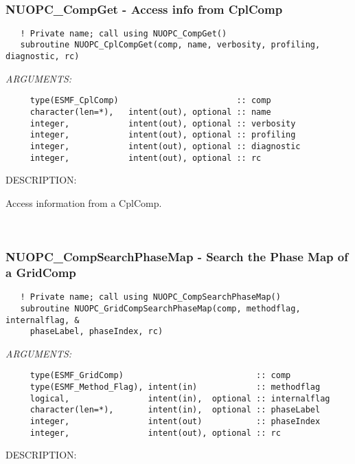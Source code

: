 \mbox{}\hrulefill\ 
 
\subsubsection [NUOPC\_CompGet] {NUOPC\_CompGet - Access info from CplComp}


\begin{verbatim}   ! Private name; call using NUOPC_CompGet()
   subroutine NUOPC_CplCompGet(comp, name, verbosity, profiling, diagnostic, rc)\end{verbatim}{\em ARGUMENTS:}
\begin{verbatim}     type(ESMF_CplComp)                        :: comp
     character(len=*),   intent(out), optional :: name
     integer,            intent(out), optional :: verbosity
     integer,            intent(out), optional :: profiling
     integer,            intent(out), optional :: diagnostic
     integer,            intent(out), optional :: rc \end{verbatim}
{\sf DESCRIPTION:\\ }


   Access information from a CplComp. 
 
\mbox{}\hrulefill\ 
 
\subsubsection [NUOPC\_CompSearchPhaseMap] {NUOPC\_CompSearchPhaseMap - Search the Phase Map of a GridComp}


\begin{verbatim}   ! Private name; call using NUOPC_CompSearchPhaseMap()
   subroutine NUOPC_GridCompSearchPhaseMap(comp, methodflag, internalflag, &
     phaseLabel, phaseIndex, rc)\end{verbatim}{\em ARGUMENTS:}
\begin{verbatim}     type(ESMF_GridComp)                           :: comp
     type(ESMF_Method_Flag), intent(in)            :: methodflag
     logical,                intent(in),  optional :: internalflag
     character(len=*),       intent(in),  optional :: phaseLabel
     integer,                intent(out)           :: phaseIndex
     integer,                intent(out), optional :: rc \end{verbatim}
{\sf DESCRIPTION:\\ }


